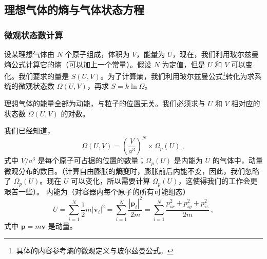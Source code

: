 

\subsection{理想气体的熵与气体状态方程}
\subsubsection{微观状态数计算}
设某理想气体由 $N $ 个原子组成，体积为 $V$，能量为 $U$，现在，我们利用玻尔兹曼熵公式计算它的熵（可以加上一个常量）。假设 $N $ 为定值，但是 $U $ 和 $V $ 可以变化。我们要求的量是 $S(U,V)$。为了计算熵，我们利用玻尔兹曼公式\footnote{具体的内容参考熵的微观定义与玻尔兹曼公式。}转化为求系统的微观状态数 $\Omega(U,V)$，再求 $S=k\ln \Omega$。

理想气体的能量全部为动能，与粒子的位置无关。我们必须求与 $U$ 和 $V$ 相对应的状态数 $\Omega(U,V)$ 的对数。

我们已经知道，
\begin{equation}
\Omega \left( U,V \right) =\left( \frac{V}{a^3} \right) ^N\times \Omega _p\left( U \right) ~,
\end{equation}
式中 $V/a^3$ 是每个原子可占据的位置的数量；$\Omega_p(U)$ 是内能为 $U$ 的气体中，动量微观分布的数目。（计算自由膨胀的\textbf{熵变}时，膨胀前后内能不变，因此，我们忽略了 $\Omega_p(U)$。现在 $U$ 可以变化，所以需要计算 $\Omega_p(U)$，这使得我们的工作会更艰苦一些）。
内能为（对容器内每个原子的所有可能组态）
\begin{equation}
U=\sum_{i=1}^N{\frac{1}{2}m\left| \boldsymbol{v}_i \right|^2}=\sum_{i=1}^N{\frac{\left| \boldsymbol{p}_i \right|^2}{2m}}=\sum_{i=1}^N{\frac{p_{ix}^{2}+p_{iy}^{2}+p_{iz}^{2}}{2m}}~,
\end{equation}
式中 $\boldsymbol p = m\boldsymbol v$ 是动量。

